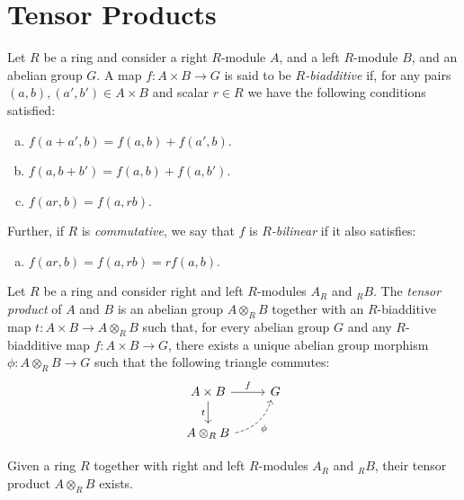 \section{Tensor Products}

\begin{definition}
\label{def:biadditive-and-bilinear-maps}
Let \(R\) be a ring and consider a right \(R\)-module \(A\), and a left
\(R\)-module \(B\), and an abelian group \(G\). A map \(f: A \times B \to G\) is
said to be \emph{\(R\)-biadditive} if, for any pairs \((a, b), (a', b') \in A \times
B\) and scalar \(r \in R\) we have the following conditions satisfied:
\begin{enumerate}[(a)]\setlength\itemsep{0em}
\item \(f(a + a', b) = f(a, b) + f(a', b)\).
\item \(f(a, b + b') = f(a, b) + f(a, b')\).
\item \(f(a r, b) = f(a, r b)\).
\end{enumerate}
Further, if \(R\) is \emph{commutative}, we say that \(f\) is
\emph{\(R\)-bilinear} if it also satisfies:
\begin{enumerate}[(a)]\setlength\itemsep{0em}\setcounter{enumi}{3}
\item \(f(a r, b) = f(a, rb) = r f(a, b)\).
\end{enumerate}
\end{definition}

\begin{definition}
\label{def:tensor-product}
Let \(R\) be a ring and consider right and left \(R\)-modules \(A_R\) and
\({}_RB\). The \emph{tensor product} of \(A\) and \(B\) is an abelian group
\(A \otimes_R B\) together with an \(R\)-biadditive map
\(t: A \times B \to A \otimes_R B\) such that, for every abelian group \(G\) and
any \(R\)-biadditive map \(f: A \times B \to G\), there exists a unique abelian
group morphism \(\phi: A \otimes_R B \to G\) such that the following triangle
commutes:
\[
\begin{tikzcd}
A \times B \ar[d, "t"'] \ar[r, "f"] &G \\
A \otimes_R B \ar[ru, dashed, "\phi"', bend right] &
\end{tikzcd}
\]
\end{definition}

\begin{lemma}[Existence]
\label{lem:tensor-product-exists}
Given a ring \(R\) together with right and left \(R\)-modules \(A_R\) and
\({}_RB\), their tensor product \(A \otimes_R B\) exists.
\end{lemma}

